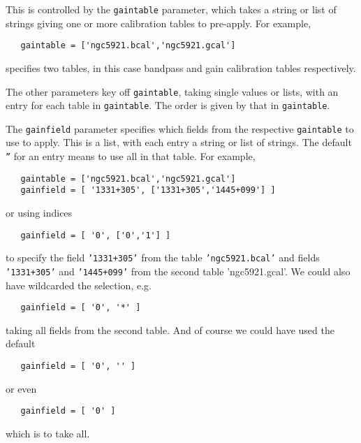 This is controlled by the {\tt gaintable} parameter, which takes 
a string or list of strings giving one or more calibration tables 
to pre-apply.  For example,

\small
\begin{verbatim}
   gaintable = ['ngc5921.bcal','ngc5921.gcal']
\end{verbatim}
\normalsize
specifies two tables, in this case bandpass and gain calibration tables
respectively.

The other parameters key off {\tt gaintable}, taking single values or
lists, with an entry for each table in {\tt gaintable}.  The order is
given by that in {\tt gaintable}.

The {\tt gainfield} parameter specifies which fields from the
respective {\tt gaintable} to use to apply.  This is a list,
with each entry a string or list of strings.  The default 
{\tt ''} for an entry means to use all in that table.  For
example,
\small
\begin{verbatim}
   gaintable = ['ngc5921.bcal','ngc5921.gcal']
   gainfield = [ '1331+305', ['1331+305','1445+099'] ]
\end{verbatim}
\normalsize
or using indices
\small
\begin{verbatim}
   gainfield = [ '0', ['0','1'] ]
\end{verbatim}
\normalsize
to specify the field {\tt '1331+305'} from the table 
{\tt 'ngc5921.bcal'} and fields {\tt '1331+305'} and 
{\tt '1445+099'} from the second table 'ngc5921.gcal'.
We could also have wildcarded the selection, e.g.
\small
\begin{verbatim}
   gainfield = [ '0', '*' ]
\end{verbatim}
\normalsize
taking all fields from the second table.  And of course we could have
used the default
\small
\begin{verbatim}
   gainfield = [ '0', '' ]
\end{verbatim}
\normalsize
or even
\small
\begin{verbatim}
   gainfield = [ '0' ]
\end{verbatim}
\normalsize
which is to take all.


